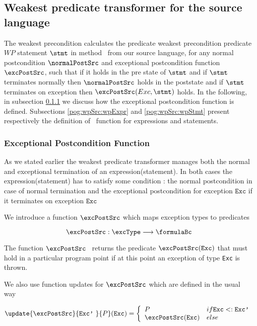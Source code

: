 


\subsection{Weakest predicate transformer for the source language } \label{pog:wpSrc}

The weakest precondition calculates  the predicate weakest precondition predicate $WP$  statement $\stmt$ in method \methodd \ from our source language,
for any normal postcondition $\normalPostSrc$ and exceptional postcondition function $\excPostSrc$, 
 such that if it holds in the pre state of $\stmt$ and   if $\stmt$ terminates normally then $\normalPostSrc$  holds in the poststate and
 if $\stmt$ terminates on exception \Exc{} then $\excPostSrc(Exc, \stmt)$ holds. 
In the following, in  subsection   \ref{pog:wpSrc:excPost} we discuss how the exceptional postcondition function is defined.
Subsections \ref{pog:wpSrc:wpExpr} and  \ref{pog:wpSrc:wpStmt} present respectively
 the definition of \wpName \  function for expressions and statements.  
 



\subsubsection{Exceptional Postcondition Function}\label{pog:wpSrc:excPost}

As we stated earlier the weakest predicate transformer manages both the normal and
 exceptional termination of  an expression(statement). 
In both cases the expression(statement) has to satisfy some condition : 
the normal postcondition in case of normal termination and the exceptional postcondition
for exception $\texttt{Exc}$ if it terminates on exception $\texttt{Exc}$


We introduce a function $\excPostSrc$  which maps exception types to predicates  

$$ \excPostSrc :  \excType \longrightarrow   \formulaBc $$ 



The function $\excPostSrc$ \ returns the predicate $\excPostSrc (\mbox{\rm\texttt{Exc}}) $ that must hold in a particular program point if
 at this point an exception of type \mbox{\rm\texttt{Exc}} is thrown.





We also use  function updates for $\excPostSrc$ which are defined in the usual way


$$
\update{\excPostSrc}{\mbox{\rm\texttt{Exc'} }}{ P }( \mbox{\rm\texttt{Exc}} )  = 
       \left\{\begin{array}{ll} 
         P & if \mbox{\rm\texttt{Exc}}  <: \mbox{\rm\texttt{Exc'}}  \\
         \excPostSrc(\mbox{\rm\texttt{Exc}} ) & else 
     \end{array}\right.$$



